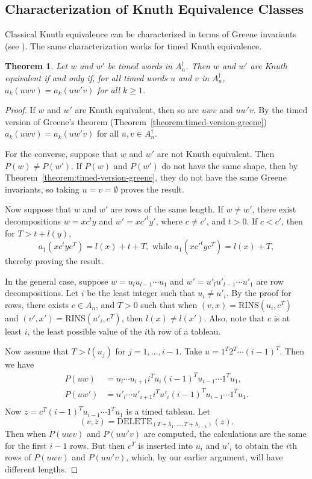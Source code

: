 \documentclass[10pt]{amsproc}
\newtheorem{theorem}{Theorem}[subsection]
\theoremstyle{definition}
\theoremstyle{remark}
\newcommand{\rowins}{\mathrm{RINS}}
\newcommand{\del}{\mathrm{DELETE}}
\begin{document}
\subsection{Characterization of Knuth Equivalence Classes}
\label{sec:char-timed-knuth}
Classical Knuth equivalence can be characterized in terms of Greene invariants (see \cite[Theorem~2.15]{plaxique}).
The same characterization works for timed Knuth equivalence.
\begin{theorem}
  Let $w$ and $w'$ be timed words in $A_n^\dagger$.
  Then $w$ and $w'$ are Knuth equivalent if and only if, for all timed words $u$ and $v$ in $A_n^\dagger$, $a_k(uwv)=a_k(uw'v)$ for all $k\geq 1$.
\end{theorem}
\begin{proof}
  If $w$ and $w'$ are Knuth equivalent, then so are $uwv$ and $uw'v$.
  By the timed version of Greene's theorem (Theorem~\ref{theorem:timed-version-greene}) $a_k(uwv)=a_k(uw'v)$ for all $u,v\in A_n^\dagger$.

  For the converse, suppose that $w$ and $w'$ are not Knuth equivalent.
  Then $P(w)\neq P(w')$.
  If $P(w)$ and $P(w')$ do not have the same shape, then by Theorem~\ref{theorem:timed-version-greene}, they do not have the same Greene invariants, so taking $u=v=\emptyset$ proves the result.

  Now suppose that $w$ and $w'$ are rows of the same length.
  If $w\neq w'$, there exist decompositions $w=xc^ty$ and $w'=x{c'}^ty'$, where $c\neq c'$, and $t>0$.
  If $c<c'$, then for $T>t+l(y)$,
  \begin{displaymath}
    a_1(xc^tyc^T) = l(x)+t+T, \text{ while } a_1(x{c'}^tyc^T) = l(x)+T,
  \end{displaymath}
  thereby proving the result.

  In the general case, suppose $w=u_lu_{l-1}\dotsb u_1$ and $w'=u'_lu'_{l-1}\dotsb u'_1$ are row decompositions.
  Let $i$ be the least integer such that $u_i\neq u'_i$.
  By the proof for rows, there exists $c\in A_n$, and $T>0$ such that when $(v,x)=\rowins(u_i,c^T)$ and $(v',x')=\rowins(u'_i,c^T)$, then $l(x)\neq l(x')$.
  Also, note that $c$ is at least $i$, the least possible value of the $i$th row of a tableau.

  Now assume that $T>l(u_j)$ for $j=1,\dotsc,i-1$.
  Take $u=1^T2^T\dotsb (i-1)^T$.
  Then we have
  \begin{align*}
    P(uw)&=u_l\dotsb u_{i+1} i^T u_i (i-1)^T u_{i-1} \dotsb 1^T u_1,\\
    P(uw')&=u'_l\dotsb u'_{i+1} i^T u'_i (i-1)^T u_{i-1} \dotsb 1^T u_1.\\
  \end{align*}
  Now $z=c^T(i-1)^T u_{i-1} \dotsb 1^T u_1$ is a timed tableau.
  Let 
  \begin{displaymath}
    (v,\bar z)=\del_{(T+\lambda_1,\dotsc,T+\lambda_{i-1})}(z).
  \end{displaymath}
  Then when $P(uwv)$ and $P(uw'v)$ are computed, the calculations are the same for the first $i-1$ rows.
  But then $c^T$ is inserted into $u_i$ and $u'_i$ to obtain the $i$th rows of $P(uwv)$ and $P(uw'v)$, which, by our earlier argument, will have different lengths.
\end{proof}
\end{document}
